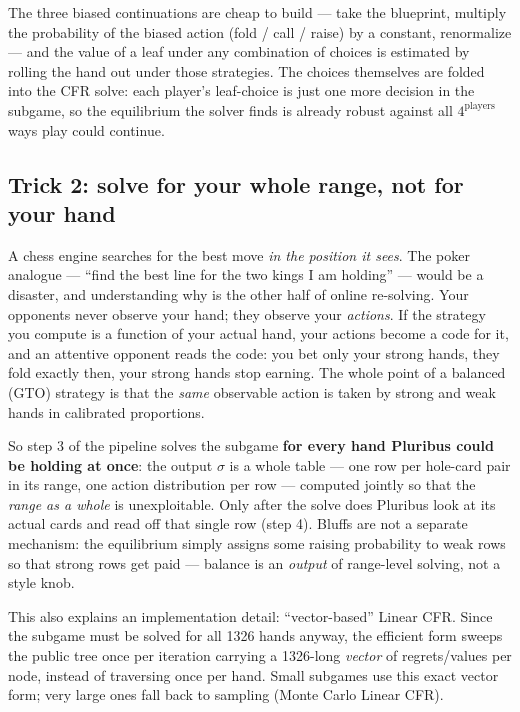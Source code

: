 \documentclass[11pt,a4paper]{article}
\begin{document}
The three biased continuations are cheap to build --- take the blueprint,
multiply the probability of the biased action (fold / call / raise) by a
constant, renormalize --- and the value of a leaf under any combination of
choices is estimated by rolling the hand out under those strategies. The
choices themselves are folded into the CFR solve: each player's leaf-choice
is just one more decision in the subgame, so the equilibrium the solver finds
is already robust against all $4^{\text{players}}$ ways play could continue.

\subsection{Trick 2: solve for your whole range, not for your hand}

A chess engine searches for the best move \emph{in the position it sees}.
The poker analogue --- ``find the best line for the two kings I am
holding'' --- would be a disaster, and understanding why is the other half of
online re-solving. Your opponents never observe your hand; they observe your
\emph{actions}. If the strategy you compute is a function of your actual
hand, your actions become a code for it, and an attentive opponent reads the
code: you bet only your strong hands, they fold exactly then, your strong
hands stop earning. The whole point of a balanced (GTO) strategy is that the
\emph{same} observable action is taken by strong and weak hands in calibrated
proportions.

So step 3 of the pipeline solves the subgame \textbf{for every hand Pluribus
could be holding at once}: the output $\sigma$ is a whole table --- one row
per hole-card pair in its range, one action distribution per row --- computed
jointly so that the \emph{range as a whole} is unexploitable. Only after the
solve does Pluribus look at its actual cards and read off that single row
(step 4). Bluffs are not a separate mechanism: the equilibrium simply
assigns some raising probability to weak rows so that strong rows get paid
--- balance is an \emph{output} of range-level solving, not a style knob.

\begin{intuition}
This also explains an implementation detail: ``vector-based'' Linear CFR.
Since the subgame must be solved for all 1326 hands anyway, the efficient
form sweeps the public tree once per iteration carrying a 1326-long
\emph{vector} of regrets/values per node, instead of traversing once per
hand. Small subgames use this exact vector form; very large ones fall back
to sampling (Monte Carlo Linear CFR).
\end{intuition}
\end{document}
